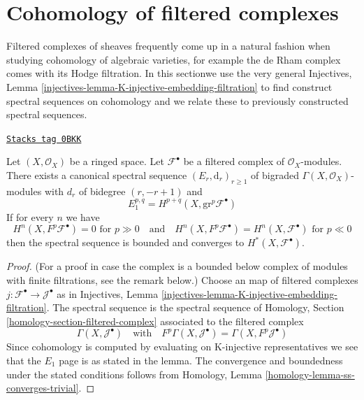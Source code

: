 \section{Cohomology of filtered complexes}
\label{cohomology-section-cohomology-filtered-object}
Filtered complexes of sheaves frequently come up in a natural fashion
when studying cohomology of algebraic varieties, for example the de Rham
complex comes with its Hodge filtration. In this sectionwe use the very general
Injectives, Lemma \ref{injectives-lemma-K-injective-embedding-filtration}
to find construct spectral sequences on cohomology and we relate these to
previously constructed spectral sequences.

\begin{lemma}
\label{cohomology-lemma-spectral-sequence-filtered-object}
\href{https://stacks.math.columbia.edu/tag/0BKK}{\texttt{Stacks tag 0BKK}}

Let $(X, \mathcal{O}_X)$ be a ringed space. Let $\mathcal{F}^\bullet$ be a
filtered complex of $\mathcal{O}_X$-modules. There exists a canonical
spectral sequence $(E_r, \text{d}_r)_{r \geq 1}$ of bigraded
$\Gamma(X, \mathcal{O}_X)$-modules with $d_r$ of bidegree $(r, -r + 1)$ and
$$
E_1^{p, q} = H^{p + q}(X, \text{gr}^p\mathcal{F}^\bullet)
$$
If for every $n$ we have
$$
H^n(X, F^p\mathcal{F}^\bullet) = 0\text{ for }p \gg 0
\quad\text{and}\quad
H^n(X, F^p\mathcal{F}^\bullet) = H^n(X, \mathcal{F}^\bullet)\text{ for }p \ll 0
$$
then the spectral sequence is bounded and converges to
$H^*(X, \mathcal{F}^\bullet)$.
\end{lemma}

\begin{proof}
(For a proof in case the complex is a bounded below complex
of modules with finite filtrations, see the remark below.)
Choose an map of filtered complexes
$j : \mathcal{F}^\bullet \to \mathcal{J}^\bullet$ as in
Injectives, Lemma
\ref{injectives-lemma-K-injective-embedding-filtration}.
The spectral sequence is the spectral sequence of
Homology, Section \ref{homology-section-filtered-complex}
associated to the filtered complex
$$
\Gamma(X, \mathcal{J}^\bullet)
\quad\text{with}\quad
F^p\Gamma(X, \mathcal{J}^\bullet) = \Gamma(X, F^p\mathcal{J}^\bullet)
$$
Since cohomology is computed by evaluating on K-injective representatives
we see that the $E_1$ page is as stated in the lemma.
The convergence and boundedness under the stated conditions
follows from Homology, Lemma \ref{homology-lemma-ss-converges-trivial}.
\end{proof}

